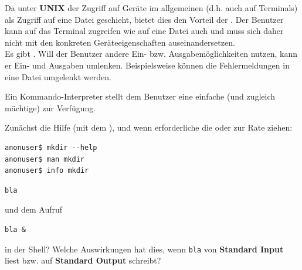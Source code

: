 \begin{answer}
Da unter \textbf{UNIX} der Zugriff auf Geräte im allgemeinen (d.h. auch auf Terminals) als Zugriff
auf eine Datei geschieht, bietet dies den Vorteil der . Der Benutzer
kann auf das Terminal zugreifen wie auf eine Datei auch und muss sich daher nicht mit den konkreten Geräteeigenschaften auseinandersetzen. \\
Es gibt . Will der Benutzer andere Ein- bzw. Ausgabemöglichkeiten nutzen, kann er Ein- und Ausgaben umlenken. Beispielsweise können die Fehlermeldungen in eine Datei umgelenkt werden.
\end{answer}

\begin{answer}
Ein Kommando-Interpreter stellt dem Benutzer eine einfache (und zugleich mächtige)  zur Verfügung.
\end{answer}

\begin{answer}
Zunächst die Hilfe (mit dem ), und wenn erforderliche die  oder  zur Rate ziehen:
\begin{lstlisting}
anonuser$ mkdir --help
anonuser$ man mkdir
anonuser$ info mkdir
\end{lstlisting}
\end{answer}

\begin{multilinequestion}

\begin{lstlisting}
bla
\end{lstlisting}

und dem Aufruf

\begin{lstlisting}
bla &
\end{lstlisting}

in der Shell? Welche Auswirkungen hat dies, wenn \texttt{bla} von \textbf{Standard Input} liest bzw. auf \textbf{Standard Output} schreibt?
\end{multilinequestion}


